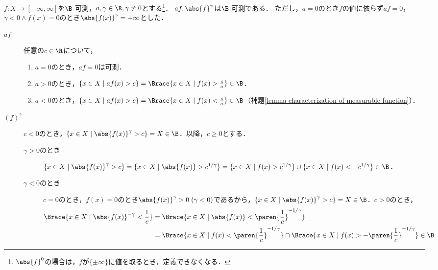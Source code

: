 \documentclass[uplatex, dvipdfmx]{jsreport}
\begin{document}
\begin{proposition}[斉次性]\label{prop-measurable-function-closed-uunder-scaling-and-power}
    $f:X\to[-\infty,\infty]$を$\B$-可測，$a,\gamma\in\R,\gamma\ne 0$とする\footnote{$\abs{f}^0$の場合は，$f$が$\{\pm\infty\}$に値を取るとき，定義できなくなる．}．
    $af,\abs{f}^\gamma$は$\B$-可測である．
    ただし，$a=0$のとき$f$の値に依らず$af=0$，$\gamma<0\land f(x)=0$のとき$\abs{f(x)}^\gamma=+\infty$とした．
\end{proposition}
\begin{Proof}\mbox{}
    \begin{description}
        \item[$af$] 任意の$c\in\R$について，\begin{enumerate}
            \item $a=0$のとき，$af=0$は可測．
            \item $a>0$のとき，$\{x\in X\mid af(x)>c\}=\Brace{x\in X\mid f(x)>\frac{c}{a}}\in\B$．
            \item $a<0$のとき，$\{x\in X\mid af(x)>c\}=\Brace{x\in X\mid f(x)<\frac{c}{a}}\in\B$（補題\ref{lemma-characterization-of-measurable-function}）．
        \end{enumerate}
        \item[$(f)^\gamma$] $c<0$のとき，$\{x\in X\mid \abs{f(x)}^\gamma>c\}=X\in\B$．以降，$c\ge 0$とする．
        \begin{description}
            \item[$\gamma>0$のとき] $\{x\in X\mid \abs{f(x)}^\gamma>c\}=\{x\in X\mid \abs{f(x)}>c^{1/\gamma}\}=\{x\in X\mid f(x)>c^{1/\gamma}\}\cup\{x\in X\mid f(x)<-c^{1/\gamma}\}\in\B$．
            \item[$\gamma<0$のとき] $c=0$のとき，$f(x)=0$のとき$\abs{f(x)}^\gamma>0\;(\gamma<0)$であるから，$\{x\in X\mid \abs{f(x)}^\gamma>c\}=X\in\B$．$c>0$のとき，
            \begin{align*}
                \Brace{x\in X\mid\abs{f(x)}^{-\gamma}<\frac{1}{c}}&=\Brace{x\in X\mid\abs{f(x)}<\paren{\frac{1}{c}}^{-1/\gamma}}\\
                &=\Brace{x\in X\mid f(x)<\paren{\frac{1}{c}}^{-1/\gamma}}\cap\Brace{x\in X\mid f(x)>-\paren{\frac{1}{c}}^{-1/\gamma}}\in\B
            \end{align*}
        \end{description}
    \end{description}
\end{Proof}
\end{document}
